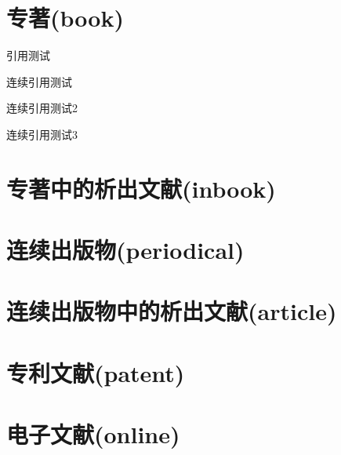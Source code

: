 \documentclass{article}
\begin{document}
\section{专著(book)}\newrefsection%
\nocite{book1}
\nocite{book2}
\nocite{book3}
\nocite{book4}
\nocite{book5}
\nocite{book6}
\nocite{book7}
\nocite{book8}
\nocite{book9}
\nocite{book10}
\nocite{book11}

引用测试\cite[][200--300]{book1}

连续引用测试\cite{book1,book2,book3,book5}

连续引用测试2\cite{book1,book2,book3,book5,book6,book7, book11}

连续引用测试3\cite{book2,book3,book5,book6,book7, book11}
\printbibliography[heading=nobibhead]%

\section{专著中的析出文献(inbook)}\newrefsection
\nocite{inbook1}
\nocite{inbook2}
\nocite{inbook3}
\nocite{inbook4}
\nocite{inbook5}
\nocite{inbook6}
\printbibliography[heading=nobibhead]

\section{连续出版物(periodical)}\newrefsection
\nocite{periodical1}
\nocite{periodical2}
\nocite{periodical3}
\printbibliography[heading=nobibhead]

\section{连续出版物中的析出文献(article)}\newrefsection
\nocite{article1}
\nocite{article2}
\nocite{article3}
\nocite{article4}
\nocite{article5}
\nocite{article6}
\printbibliography[heading=nobibhead]

\section{专利文献(patent)}\newrefsection
\nocite{patent1}
\nocite{patent2}
\nocite{patent3}
\printbibliography[heading=nobibhead]

\section{电子文献(online)}\newrefsection
\nocite{online1}
\nocite{online2}
\nocite{online3}
\printbibliography[heading=nobibhead]
\end{document}
